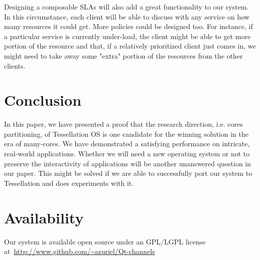 \documentclass[letterpaper,twocolumn,10pt]{article}
\begin{document}
Designing a composable SLAs will also add a great functionality to our system. In this circumstance, each client will be able to discuss with any service on how many resources it could get. More policies could be designed too. For instance, if a particular service is currently under-load, the client might be able to get more portion of the resource and that, if a relatively prioritized client just comes in, we might need to take away some "extra" portion of the resources from the other clients.

\section{Conclusion}

In this paper, we have presented a proof that the research direction, i.e. cores partitioning, of Tessellation OS is one candidate for the winning solution in the era of many-cores. We have demonstrated a satisfying performance on intricate, real-world applications. Whether we will need a new operating system or not to preserve the interactivity of applications will be another unanswered question in our paper. This might be solved if we are able to successfully port our system to Tessellation and does experiments with it.

\section{Availability}

Our system is available open source under an GPL/LGPL license at~\url{http://www.github.com/~azuriel/Qt-channels}

\footnotesize{
}

\theendnotes
\end{document}
